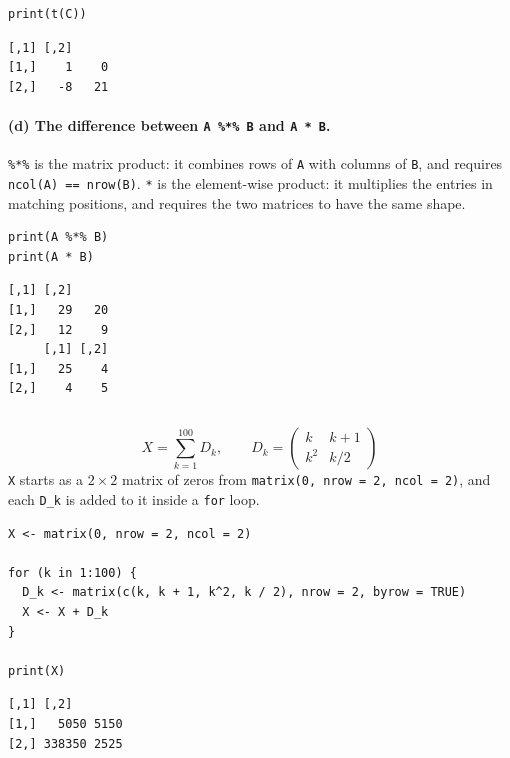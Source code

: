 \documentclass[11pt]{article}
\newcommand{\code}[1]{\texttt{#1}}
\begin{document}
\begin{lstlisting}[style=Rcode]
print(t(C))
\end{lstlisting}

\begin{lstlisting}[style=Routput]
     [,1] [,2]
[1,]    1    0
[2,]   -8   21
\end{lstlisting}

\paragraph{(d) The difference between \texttt{A \%*\% B} and \texttt{A * B}.}
\code{\%*\%} is the matrix product: it combines rows of \code{A} with columns of
\code{B}, and requires \code{ncol(A) == nrow(B)}. \code{*} is the element-wise
product: it multiplies the entries in matching positions, and requires the two
matrices to have the same shape.

\begin{lstlisting}[style=Rcode]
print(A %*% B)
print(A * B)
\end{lstlisting}

\begin{lstlisting}[style=Routput]
     [,1] [,2]
[1,]   29   20
[2,]   12    9
     [,1] [,2]
[1,]   25    4
[2,]    4    5
\end{lstlisting}

\subsection{}
\label{sec:q1-loop}

\[
X = \sum_{k=1}^{100} D_k,
\qquad
D_k = \begin{pmatrix} k & k+1\\ k^2 & k/2 \end{pmatrix}
\]
\code{X} starts as a $2\times2$ matrix of zeros from \code{matrix(0, nrow = 2,
ncol = 2)}, and each \code{D\_k} is added to it inside a \code{for} loop.

\begin{lstlisting}[style=Rcode]
X <- matrix(0, nrow = 2, ncol = 2)

for (k in 1:100) {
  D_k <- matrix(c(k, k + 1, k^2, k / 2), nrow = 2, byrow = TRUE)
  X <- X + D_k
}

print(X)
\end{lstlisting}

\begin{lstlisting}[style=Routput]
       [,1] [,2]
[1,]   5050 5150
[2,] 338350 2525
\end{lstlisting}
\end{document}
